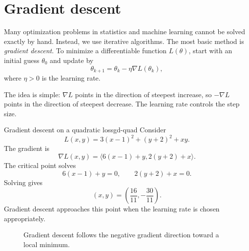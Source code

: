 \documentclass[11pt]{article}
\newcommand{\grad}{\nabla}
\begin{document}
\section{Gradient descent}

Many optimization problems in statistics and machine learning cannot be solved exactly by hand. Instead, we use iterative algorithms. The most basic method is \emph{gradient descent}. To minimize a differentiable function $L(\theta)$, start with an initial guess $\theta_0$ and update by
\[
\theta_{k+1}=\theta_k-\eta\grad L(\theta_k),
\]
where $\eta>0$ is the learning rate.

The idea is simple: $\grad L$ points in the direction of steepest increase, so $-\grad L$ points in the direction of steepest decrease. The learning rate controls the step size.

\begin{workedexample}{Gradient descent on a quadratic loss}{gd-quad}
Consider
\[
L(x,y)=3(x-1)^2+(y+2)^2+xy.
\]
The gradient is
\[
\grad L(x,y)=\langle 6(x-1)+y,2(y+2)+x\rangle.
\]
The critical point solves
\[
6(x-1)+y=0,
\qquad
2(y+2)+x=0.
\]
Solving gives
\[
(x,y)=\left(\frac{16}{11},-\frac{30}{11}\right).
\]
Gradient descent approaches this point when the learning rate is chosen appropriately.
\end{workedexample}

\begin{figure}[H]
\centering
{}
\caption{Gradient descent follows the negative gradient direction toward a local minimum.}
\end{figure}
\end{document}
